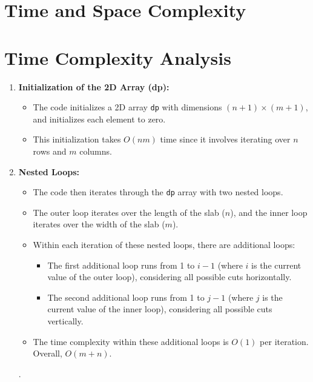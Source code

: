 \documentclass{article}
\begin{document}
{\section*{\huge{Time and Space Complexity}}
\section*{Time Complexity Analysis}

\begin{enumerate}
    \item \textbf{Initialization of the 2D Array (dp):}
    \begin{itemize}
        \item The code initializes a 2D array \texttt{dp} with dimensions $(n+1) \times (m+1)$, and initializes each element to zero.
        \item This initialization takes $O(nm)$ time since it involves iterating over $n$ rows and $m$ columns.
    \end{itemize}
    
    \item \textbf{Nested Loops:}
    \begin{itemize}
        \item The code then iterates through the \texttt{dp} array with two nested loops.
        \item The outer loop iterates over the length of the slab ($n$), and the inner loop iterates over the width of the slab ($m$).
        \item Within each iteration of these nested loops, there are additional loops:
        \begin{itemize}
            \item The first additional loop runs from 1 to $i - 1$ (where $i$ is the current value of the outer loop), considering all possible cuts horizontally.
            \item The second additional loop runs from 1 to $j - 1$ (where $j$ is the current value of the inner loop), considering all possible cuts vertically.
        \end{itemize}
        \item The time complexity within these additional loops is $O(1)$ per iteration. Overall, $O(m+n)$.
    \end{itemize}. 
    

\end{enumerate}}
\end{document}
